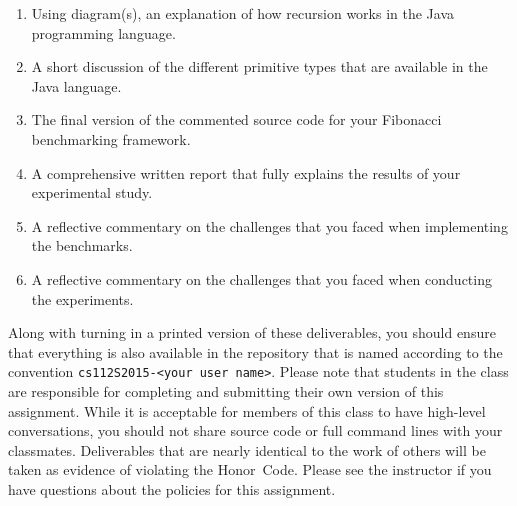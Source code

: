     \vspace*{-.1in}
  \begin{enumerate} 
  \itemsep0pt
  \item Using diagram(s), an explanation of how recursion works in the Java programming language.

  \item A short discussion of the different primitive types that are available in the Java language.

  \item The final version of the commented source code for your Fibonacci benchmarking framework.

  \item A comprehensive written report that fully explains the results of your experimental study.

  \item A reflective commentary on the challenges that you faced when implementing the benchmarks.

  \item A reflective commentary on the challenges that you faced when conducting the experiments.
   
  \end{enumerate}
    \vspace*{-.1in}

  Along with turning in a printed version of these deliverables, you should ensure that everything is also available in
  the repository that is named according to the convention {\tt cs112S2015-<your user name>}. Please note that students
  in the class are responsible for completing and submitting their own version of this assignment.    While it is
  acceptable for members of this class to have high-level conversations, you should not share source code or full
  command lines with your classmates.  Deliverables that are nearly identical to the work of others will be taken as
  evidence of violating the \mbox{Honor Code}.  Please see the instructor if you have questions about the policies for
  this assignment.

  
